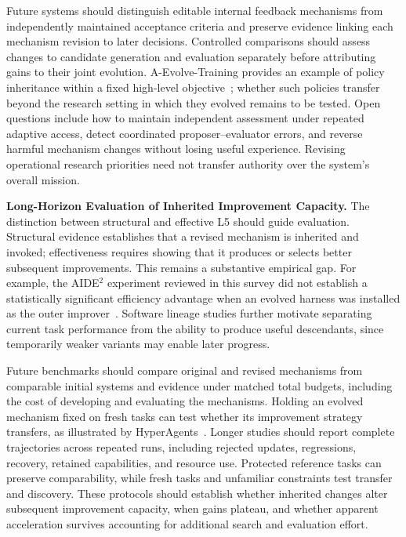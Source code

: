 Future systems should distinguish editable internal feedback mechanisms from independently maintained acceptance criteria and preserve evidence linking each mechanism revision to later decisions. Controlled comparisons should assess changes to candidate generation and evaluation separately before attributing gains to their joint evolution. A-Evolve-Training provides an example of policy inheritance within a fixed high-level objective~\cite{shi2026aevolvetraining}; whether such policies transfer beyond the research setting in which they evolved remains to be tested. Open questions include how to maintain independent assessment under repeated adaptive access, detect coordinated proposer--evaluator errors, and reverse harmful mechanism changes without losing useful experience. Revising operational research priorities need not transfer authority over the system's overall mission.

\noindent\textbf{Long-Horizon Evaluation of Inherited Improvement Capacity.}
The distinction between structural and effective L5 should guide evaluation. Structural evidence establishes that a revised mechanism is inherited and invoked; effectiveness requires showing that it produces or selects better subsequent improvements. This remains a substantive empirical gap. For example, the AIDE$^{2}$ experiment reviewed in this survey did not establish a statistically significant efficiency advantage when an evolved harness was installed as the outer improver~\cite{weco2026aide2}. Software lineage studies further motivate separating current task performance from the ability to produce useful descendants, since temporarily weaker variants may enable later progress.

Future benchmarks should compare original and revised mechanisms from comparable initial systems and evidence under matched total budgets, including the cost of developing and evaluating the mechanisms. Holding an evolved mechanism fixed on fresh tasks can test whether its improvement strategy transfers, as illustrated by HyperAgents~\cite{zhang2026hyperagents}. Longer studies should report complete trajectories across repeated runs, including rejected updates, regressions, recovery, retained capabilities, and resource use. Protected reference tasks can preserve comparability, while fresh tasks and unfamiliar constraints test transfer and discovery. These protocols should establish whether inherited changes alter subsequent improvement capacity, when gains plateau, and whether apparent acceleration survives accounting for additional search and evaluation effort.

